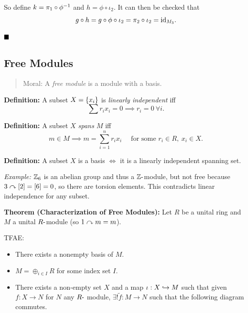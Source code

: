 So define \(k = \pi_1 \circ \phi^{-1}\) and \(h = \phi \circ \iota_2\).
It can then be checked that \[
g \circ h = g \circ \phi \circ \iota_2 = \pi_2 \circ \iota_2 = \text{id}_{M_3}
.\]

\(\qed\)

\hypertarget{free-modules}{%
\subsection{Free Modules}\label{free-modules}}

\begin{quote}
Moral: A \emph{free module} is a module with a basis.
\end{quote}

\textbf{Definition:} A subset \(X = \left\{{x_i}\right\}\) is \emph{linearly
independent} iff \[
\sum r_i x_i = 0 \implies r_i = 0 ~\forall i
.\]

\textbf{Definition:} A subset \(X\) \emph{spans} \(M\) iff \[
m\in M \implies m = \sum_{i=1}^n r_i x_i \quad \text{ for some }r_i \in R,~x_i \in X
.\]

\textbf{Definition:} A subset \(X\) is a basis \(\iff\) it is a linearly
independent spanning set.

\emph{Example:} \({\mathbb{Z}}_6\) is an abelian group and thus a
\({\mathbb{Z}}{\hbox{-}}\)module, but not free because \(3 \curvearrowright [2] = [6] = 0\), so
there are torsion elements. This contradicts linear independence for any
subset.

\textbf{Theorem (Characterization of Free Modules):} Let \(R\) be a
unital ring and \(M\) a unital \(R{\hbox{-}}\)module (so \(1\curvearrowright m = m\)).

TFAE:

\begin{itemize}
\item
  There exists a nonempty basis of \(M\).
\item
  \(M = \oplus_{i\in I} R\) for some index set \(I\).
\item
  There exists a non-empty set \(X\) and a map \(\iota: X \hookrightarrow M\)
  such that given \(f: X \to N\) for \(N\) any \(R{\hbox{-}}\) module,
  \(\exists! \tilde f: M \to N\) such that the following diagram
  commutes.
\end{itemize}

\begin{center}
\end{center}

